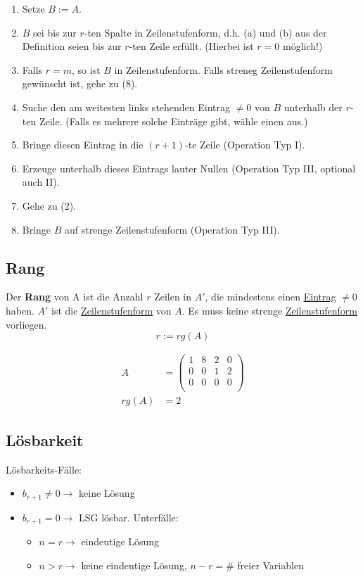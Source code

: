 \documentclass{scrartcl}
\newcommand{\linkTo}[1]{\hyperref[#1]{\underline{#1}}}
\begin{document}
\begin{enumerate}[label={(\arabic*)}]
\item Setze $B := A$.
\item $B$ sei bis zur $r$-ten Spalte in Zeilenstufenform, d.h. (a) und (b) aus der Definition seien bis zur $r$-ten Zeile erfüllt. (Hierbei ist $r = 0$ möglich!)
\item Falls $r = m$, so ist $B$ in Zeilenstufenform. Falls streneg Zeilenstufenform gewünscht ist, gehe zu (8).
\item Suche den am weitesten links stehenden Eintrag $\neq 0$ von $B$ unterhalb der $r$-ten Zeile. (Falls es mehrere solche Einträge gibt, wähle einen aus.)
\item Bringe diesen Eintrag in die $(r + 1)$-te Zeile (Operation Typ I).
\item Erzeuge unterhalb dieses Eintrags lauter Nullen (Operation Typ III, optional auch II).
\item Gehe zu (2).
\item Bringe $B$ auf strenge Zeilenstufenform (Operation Typ III).
\end{enumerate}

\subsection{Rang}
\label{Rang}

\begin{Def}
Der \textbf{Rang} von A ist die Anzahl $r$ Zeilen in $A'$, die mindestens einen \linkTo{Eintrag} $\neq 0$ haben. $A'$ ist die \linkTo{Zeilenstufenform} von $A$. Es muss keine strenge \linkTo{Zeilenstufenform} vorliegen.
\[r := rg(A)\]
\end{Def}
\begin{Beispiel}
\begin{align*}
    A &= \begin{pmatrix}
        1 & 8 & 2 & 0 \\
        0 & 0 & 1 & 2 \\
        0 & 0 & 0 & 0 \\
    \end{pmatrix}\\
    rg(A) &= 2
\end{align*}
\end{Beispiel}


\subsection{Lösbarkeit}
\label{Lösbarkeit}
Lösbarkeits-Fälle:
	\begin{itemize}
		\item $b_{r+1} \neq 0 \rightarrow $ keine Lösung
		\item $b_{r+1} = 0 \rightarrow $ LSG lösbar. Unterfälle:
		\begin{itemize}
			\item $ n = r \rightarrow $ eindeutige Lösung
			\item $n > r \rightarrow $ keine eindeutige Lösung, $n - r = \# $ freier Variablen
		\end{itemize}
	\end{itemize}
	
\end{document}
